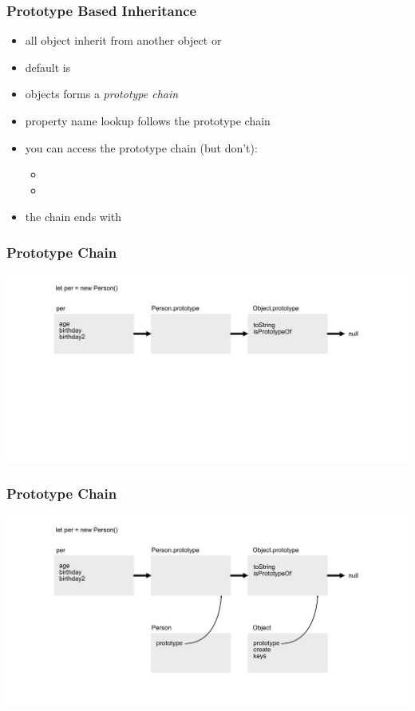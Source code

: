 \begin{frame}[fragile] \frametitle{Prototype Based Inheritance}

\begin{itemize}
  \item all object inherit from another object or 
  \item default is 
  \item objects forms a \emph{prototype chain}
  \item property name lookup follows the prototype chain
  \item you can access the prototype chain (but don't):
  \begin{itemize}
    \item {}
    \item {}
  \end{itemize}
  \item the chain ends with 
\end{itemize}
\end{frame}

\begin{frame}[fragile]
\frametitle{Prototype Chain}
  \centering
  \includegraphics[width=14cm]{img/prototype_chain}

\end{frame}

\begin{frame}[fragile]
\frametitle{Prototype Chain}
  \centering
  \includegraphics[width=14cm]{img/prototype_chain2}
\end{frame}

